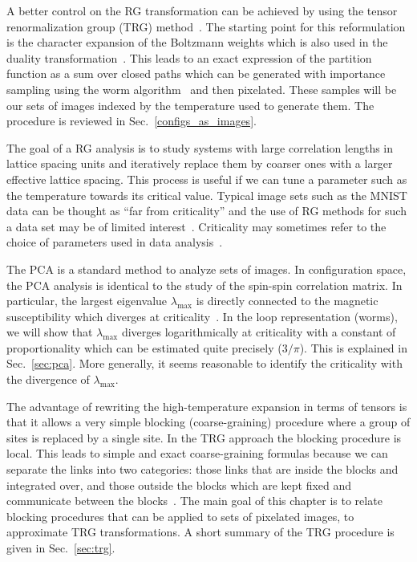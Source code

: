 \documentclass[../main.tex]{subfiles}
\begin{document}
A better control on the RG transformation can be achieved by using the tensor
renormalization group (TRG)
method~\cite{PhysRevLett.99.120601,PhysRevB.79.085118,PhysRevB.86.045139,prb87,prd88,prd89,pre89}.
%
The starting point for this reformulation is the character expansion of the
Boltzmann weights which is also used in the duality
transformation~\cite{RevModPhys.52.453}.
%
This leads to an exact expression of the partition function  as a sum over
closed paths which can be generated with importance sampling using  the worm
algorithm~\cite{prok87} and then pixelated.
%
These samples will be our sets of images indexed by the temperature used to
generate them.  The procedure is reviewed in Sec.~\ref{configs_as_images}. 

The goal of a RG analysis is to study systems with large correlation lengths in
lattice spacing units and iteratively replace them by coarser ones with a
larger effective lattice spacing.
%
This process is useful if we can tune a parameter such as the temperature
towards its critical value.
%
Typical image sets such as the MNIST data can be thought as ``far from
criticality'' and the use of RG methods for such a data set may be of limited
interest~\cite{foreman2017}.  Criticality may sometimes refer to the choice of
parameters used in data analysis~\cite{PhysRevD.83.105014}. 

The PCA is a standard method to analyze sets of images.
%
In configuration space, the PCA analysis is identical to the study of the
spin-spin correlation matrix.
%
In particular, the largest eigenvalue $\lambda_{\mathrm{max}}$ is directly
connected to the magnetic susceptibility which diverges at
criticality~\cite{PhysRevB.94.195105}.
%
In the loop representation (worms), we will show that $\lambda_{\mathrm{max}}$
diverges logarithmically at criticality  with a constant of proportionality
which can be estimated quite precisely ($3/\pi$).
%
This is explained in Sec.~\ref{sec:pca}.  More generally, it seems reasonable
to identify the criticality with the divergence of $\lambda_{\mathrm{max}}$.

The advantage of rewriting the high-temperature expansion in terms of tensors
is that it allows a very simple blocking (coarse-graining) procedure where a
group of sites is replaced by a single site.
%
In the TRG approach the blocking procedure is local.
%
This leads to simple and exact coarse-graining formulas because we can separate
the links into two categories: those links that are inside the blocks and
integrated over, and those outside the blocks which are kept fixed and
communicate between the blocks~\cite{prb87}.
%
The main goal of this chapter is to relate blocking procedures that can be
applied to sets of pixelated images, to approximate TRG transformations.
%
A short summary of the TRG procedure is given in Sec.~\ref{sec:trg}.
\end{document}
